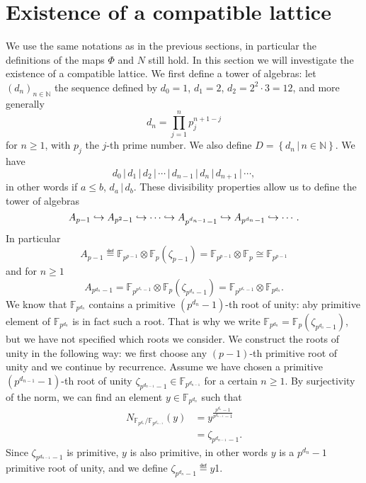\documentclass[a4paper,11pt]{article}
\begin{document}
\section{Existence of a compatible lattice}
\label{sec:existence}
We use the same notations as in the previous sections, in particular the
definitions of the maps $\Phi$ and $N$ still hold.
In this section we will investigate the existence of a compatible lattice. We
first define a tower of algebras: let $(d_n)_{n\in\mathbb{N}}$ the sequence
defined by $d_0=1$, $d_1=2$, $d_2=2^2\cdot 3=12$, and more generally
\[
  d_n = \prod_{j=1}^n p_j^{n+1-j}
\]
for $n\geq1$, with $p_j$ the $j$-th prime number. We also define
$D=\left\{d_n\,|\,n\in\mathbb{N}\right\}$. We have 
\[
  d_0\,|\,d_1\,|\,d_2\,|\,\cdots\,|\,d_{n-1}\,|\,d_n\,|\,d_{n+1}\,|\,\cdots,
\]
in other words if $a\leq b$, $d_a\,|\,d_b$. These divisibility properties allow
us to define the tower of algebras
\[
  A_{p-1}\hookrightarrow A_{p^{2}-1}\hookrightarrow\cdots\hookrightarrow A_{p^{d_{n-1}}-1}\hookrightarrow
  A_{p^{d_n}-1}\hookrightarrow\cdots.
\]
In particular
\[
  A_{p-1}\eqdef
\mathbb{F}_{p^{p-1}}\otimes\mathbb{F}_{p}(\zeta_{p-1})=\mathbb{F}_{p^{p-1}}\otimes\mathbb{F}_p\cong\mathbb{F}_{p^{p-1}}
\]
and for $n\geq1$
\[
  A_{p^{d_n}-1}=\mathbb{F}_{p^{p^{d_n}-1}}\otimes\mathbb{F}_p(\zeta_{p^{d_n}-1})=\mathbb{F}_{p^{p^{d_n}-1}}\otimes\mathbb{F}_{p^{d_n}}.
\]
We know that $\mathbb{F}_{p^{d_n}}$ contains a primitive $(p^{d_n}-1)$-th root
of unity: aby primitive element of $\mathbb{F}_{p^{d_n}}$ is in fact such a
root. That is why we write
$\mathbb{F}_{p^{d_n}}=\mathbb{F}_{p}(\zeta_{p^{d_n}-1})$, but we have not
specified which roots we consider.
We construct the roots of unity in the following way: we first choose any $(p-1)$-th primitive root of unity and we continue by recurrence. Assume we have
chosen a primitive $(p^{d_{n-1}}-1)$-th root of unity
$\zeta_{p^{d_{n-1}}-1}\in\mathbb{F}_{p^{d_{n-1}}}$
for a certain $n\geq1$. By surjectivity of the norm, we can find an element
$y\in\mathbb{F}_{p^{d_n}}$ such that
\begin{align*}
  N_{\mathbb{F}_{p^{d_n}}/\mathbb{F}_{p^{d_{n-1}}}}(y)&=y^{\frac{p^{d_n}-1}{p^{d_{n-1}}-1}}\\
  &=\zeta_{p^{d_{n-1}}-1}.
\end{align*}
Since $\zeta_{p^{d_{n-1}}-1}$ is primitive, $y$ is also primitive, in other
words $y$ is a $p^{d_n}-1$ primitive root of unity, and we define
$\zeta_{p^{d_n}-1}\eqdef y$1.
\end{document}
